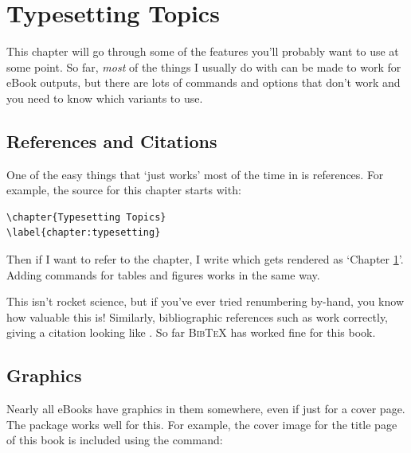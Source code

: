 \chapter{Typesetting Topics}
\label{chapter:typesetting}

This chapter will go through some of the \tex features you'll probably want to use at some point.
So far, {\em most} of the things I usually do with \tex can be made to work for eBook outputs,
but there are lots of commands and options that don't work and you need to know which
variants to use.

\section{References and Citations}

One of the easy things that `just works' most of the time in \latex is references. For example,
the \tex source for this chapter starts with:

\begin{Verbatim}[fontsize=\small]
\chapter{Typesetting Topics}
\label{chapter:typesetting}
\end{Verbatim}

Then if I want to refer to the chapter, I write  which
gets rendered as `Chapter \ref{chapter:typesetting}'. Adding  commands for tables and figures
works in the same way.

This isn't rocket science, but if you've ever tried
renumbering by-hand, you know how valuable this is! Similarly, bibliographic references such as
 work correctly, giving a citation looking like \cite{knuth1984texbook}.
So far \textsc{BibTeX} has worked fine for this book.

\section{Graphics}

Nearly all eBooks have graphics in them somewhere, even if just for a cover page. 
The  package works well for this.
For example, the cover image for the title page of this book is included using the command:


